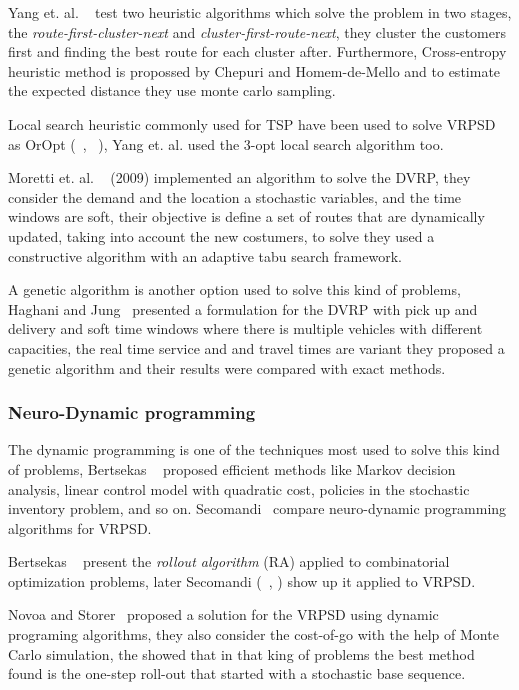 Yang et. al. ~\cite{yang_stochastic_2000} test two heuristic algorithms which solve the problem in two stages, the \textit{route-first-cluster-next} and \textit{cluster-first-route-next}, they cluster the customers  first and finding the best route for each cluster after. Furthermore, Cross-entropy heuristic method is propossed by Chepuri and Homem-de-Mello \cite{Chepuri} and to estimate the expected distance they use monte carlo sampling.

Local search heuristic commonly used for TSP have been used to solve VRPSD as OrOpt (~\cite{yang_stochastic_2000}, ~\cite{bianchi_hybrid_2006}), Yang et. al. used the 3-opt local search algorithm too.

Moretti et. al. ~\cite{Moretti} (2009) implemented an algorithm to solve the DVRP, they consider the demand and the location a stochastic variables, and the time windows are soft, their objective is define a set of routes that are dynamically updated, taking into account the new costumers, to solve they used a constructive algorithm with an adaptive tabu search framework.

A genetic algorithm is another option used to solve this kind of problems, Haghani and Jung~\cite{haghani_dynamic_2005} presented a formulation for the DVRP with pick up and delivery and soft time windows  where there is multiple vehicles with different capacities, the real time service and and travel times are variant they proposed a genetic algorithm and their results were compared with exact methods.

\subsubsection{Neuro-Dynamic programming}


The dynamic programming is one of the techniques most used to solve this kind of problems, Bertsekas ~\cite{Bertsekas} proposed efficient methods like Markov decision analysis, linear control model with quadratic cost, policies in the stochastic inventory problem, and so on. Secomandi~\cite{secomandi_comparing_2000} compare neuro-dynamic programming algorithms for VRPSD.

Bertsekas ~\cite{Bertsekas1997} present the \textit{rollout algorithm} (RA) applied to combinatorial optimization problems, later Secomandi (~\cite{Secomandi_1998}, \cite{secomandi_rollout_2001}) show up it applied to VRPSD.

Novoa and Storer~\cite{novoa_approximate_2009} proposed a solution for the VRPSD using dynamic programing algorithms, they also consider the cost-of-go with the help of Monte Carlo simulation, the showed that in that king of problems the best method found is the one-step roll-out that started with a stochastic base sequence.


